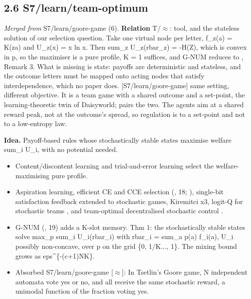 \documentclass[10pt]{article}
\begin{document}
\subsection{2.6 S7/learn/team-optimum}\label{node:S7-S7-learn-team-optimum}
\textit{Merged from} S7/learn/goore-game (6). \textbf{Relation} \textsf{T}/$\approx$: tool, and the stateless solution of our selection question. Take one virtual node per letter, f\_z(a) = K(z\textbar{}a) and U\_z(x) = x ln x. Then sum\_z U\_z(rbar\_z) = -H(Z), which is convex in p, so the maximiser is a pure profile, K = 1 suffices, and G-NUM reduces to \citet{Marden-achieving14}, Remark 3. What is missing is state: payoffs are deterministic and stateless, and the outcome letters must be mapped onto acting nodes that satisfy interdependence, which no paper does. [S7/learn/goore-game] same setting, different objective. It is a team game with a shared outcome and a set-point, the learning-theoretic twin of Daisyworld; \citet{Andrew-goore86} pairs the two. The agents aim at a shared reward peak, not at the outcome's spread, so regulation is to a set-point and not to a low-entropy law.

\textbf{Idea.} Payoff-based rules whose stochastically stable states maximise welfare sum\_i U\_i, with no potential needed.
\begin{itemize}[nosep,leftmargin=1.2em]
\item Content/discontent learning \citep{Marden-achieving14} and trial-and-error learning \citep{PradelskiYoung-learning12} select the welfare-maximising pure profile.
\item Aspiration learning, efficient CE and CCE selection (\citet{Borowski-learning15}, 18; \citet{Marden-selecting17}), single-bit satisfaction feedback extended to stochastic games, Kiremitci x3, logit-Q for stochastic teams \citep{Donmez-logitq25}, and team-optimal decentralised stochastic control \citep{Yongacoglu-decentralized22}.
\item G-NUM (\citet{Ramakrishnan-completely16}, 19) adds a K-slot memory. Thm 1: the stochastically stable states solve max\_p sum\_i U\_i(rbar\_i) with rbar\_i = sum\_a p(a) f\_i(a), U\_i possibly non-concave, over p on the grid \{0, 1/K..., 1\}. The mixing bound grows as eps\^{}\{-(c+1)NK\}.
\item Absorbed S7/learn/goore-game [\ensuremath{\approx}]: In Tsetlin's Goore game, N independent automata vote yes or no, and all receive the same stochastic reward, a unimodal function of the fraction voting yes.
\end{itemize}
\end{document}

